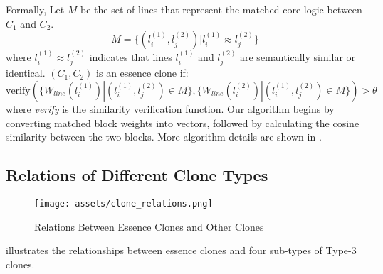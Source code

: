 Formally, Let $M$ be the set of lines that represent the matched core logic between $C_1$ and $C_2$.
$$ 
    M = \{ (l_i^{(1)}, l_j^{(2)}) | l_i^{(1)} \approx l_j^{(2)}\}
$$
where $l_i^{(1)} \approx l_j^{(2)}$ indicates that lines $l_i^{(1)}$ and $l_j^{(2)}$ are semantically similar or identical.
$ (C_1, C_2) $ is an essence clone if: $$
    \text{verify} ( \{W_{line}(l_i^{(1)}) | (l_i^{(1)}, l_j^{(2)})\in M\}, \{W_{line}(l_i^{(2)}) | (l_i^{(1)}, l_j^{(2)})\in M\}) > \theta
$$ 
where \textit{verify} is the similarity verification function. Our algorithm begins by converting matched block weights into vectors, followed by calculating the cosine similarity between the two blocks. More algorithm details are shown in .

\subsection{Relations of Different Clone Types}

\begin{figure}
    \centering
    \texttt{[image: assets/clone\_relations.png]}
    \caption{Relations Between Essence Clones and Other Clones}
    \label{fig:clone-relation}
\end{figure}

 illustrates the relationships between essence clones and four sub-types of Type-3 clones. 

